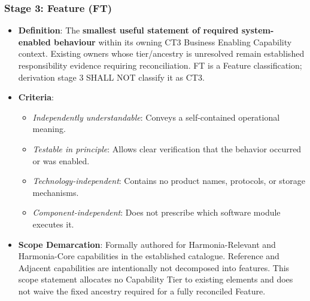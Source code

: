 \label{rad:tier-model:120}
\subsubsection*{Stage 3: Feature (FT)}
\label{rad:tier-model:121}

\begin{itemize}

\item 
\textbf{Definition}: The \textbf{smallest useful statement of required system-enabled behaviour} within its owning CT3 Business Enabling Capability context. Existing owners whose tier/\allowbreak{}ancestry is unresolved remain established responsibility evidence requiring reconciliation. FT is a Feature classification; derivation stage 3 SHALL NOT classify it as CT3.



\item 
\textbf{Criteria}:


\begin{itemize}

\item 
\emph{Independently understandable}: Conveys a self-contained operational meaning.



\item 
\emph{Testable in principle}: Allows clear verification that the behavior occurred or was enabled.



\item 
\emph{Technology-independent}: Contains no product names, protocols, or storage mechanisms.



\item 
\emph{Component-independent}: Does not prescribe which software module executes it.



\end{itemize}


\item 
\textbf{Scope Demarcation}: Formally authored for Harmonia-Relevant and Harmonia-Core capabilities in the established catalogue. Reference and Adjacent capabilities are intentionally not decomposed into features. This scope statement allocates no Capability Tier to existing elements and does not waive the fixed ancestry required for a fully reconciled Feature.



\end{itemize}
\label{rad:tier-model:129}
